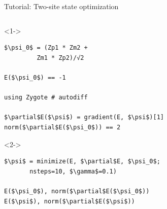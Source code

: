 \begin{frame}[fragile]{Tutorial: Two-site state optimization}

\begin{columns}

\begin{column}{5cm}

\begin{onlyenv}<1->
\begin{lstlisting}[language=JuliaLocal, style=julia, mathescape, basicstyle=\small]
$\psi_0$ = (Zp1 * Zm2 +
         Zm1 * Zp2)/√2

E($\psi_0$) == -1

using Zygote # autodiff

$\partial$E($\psi$) = gradient(E, $\psi$)[1]
norm($\partial$E($\psi_0$)) == 2
\end{lstlisting}
\end{onlyenv}

\begin{onlyenv}<2->
\begin{lstlisting}[language=JuliaLocal, style=julia, mathescape, basicstyle=\small]
$\psi$ = minimize(E, $\partial$E, $\psi_0$;
       nsteps=10, $\gamma$=0.1)

E($\psi_0$), norm($\partial$E($\psi_0$))
E($\psi$), norm($\partial$E($\psi$))
 \end{lstlisting}
\end{onlyenv}

\end{column}

\begin{column}{5cm}



\end{column}
\end{columns}
\end{frame}
